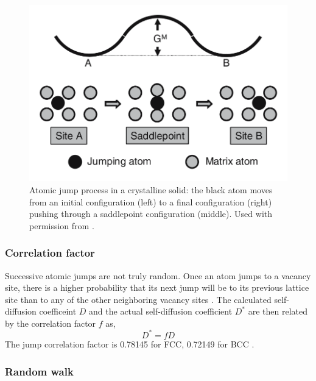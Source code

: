 \documentclass{article}
\begin{document}
\begin{figure}[htp] 
\centering
\includegraphics[scale=0.7]{jumping_atom}
\caption{Atomic jump process in a crystalline solid: the black atom moves from an initial configuration (left) to a final configuration (right) pushing through a saddlepoint configuration (middle). Used with permission from \cite{Mehrer2007}.}
\label{fig:2}
\end{figure}

\subsubsection{Correlation factor}

Successive atomic jumps are not truly random. Once an atom jumps to a vacancy site, there is a higher probability that its next jump will be to its previous lattice site than to any of the other neighboring vacancy sites \cite{Leclaire}. The calculated self-diffusion coefficeint $D$ and the actual self-diffusion coefficient $D^*$ are then related by the correlation factor $f$ as,
%
\begin{equation} \label{eq:4}
D^* = fD
\end{equation}
%
The jump correlation factor is 0.78145 for FCC, 0.72149 for BCC \cite{Montet1973}. 

\subsubsection{Random walk}
\end{document}
